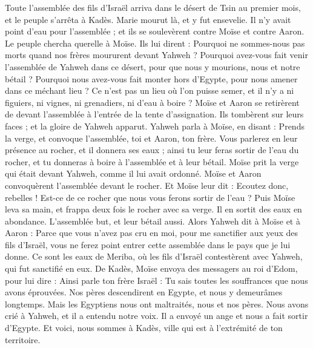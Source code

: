 \begin{multicols}{2}
\VerseOne{}Toute l’assemblée des fils d'Israël arriva dans le désert de Tsin au premier mois, et le peuple s’arrêta à Kadès. Marie mourut là, et y fut ensevelie.
Il n’y avait point d'eau pour l'assemblée ; et ils se soulevèrent contre Moïse et contre Aaron.
Le peuple chercha querelle à Moïse. Ils lui dirent : Pourquoi ne sommes-nous pas morts quand nos frères moururent devant Yahweh ?
Pourquoi avez-vous fait venir l'assemblée de Yahweh dans ce désert, pour que nous y mourions, nous et notre bétail ?
Pourquoi nous avez-vous fait monter hors d'Egypte, pour nous amener dans ce méchant lieu ? Ce n’est pas un lieu où l’on puisse semer, et il n’y a ni figuiers, ni vignes, ni grenadiers, ni d'eau à boire ?
Moïse et Aaron se retirèrent de devant l'assemblée à l'entrée de la tente d'assignation. Ils tombèrent sur leurs faces ; et la gloire de Yahweh apparut.
Yahweh parla à Moïse, en disant :
Prends la verge, et convoque l'assemblée, toi et Aaron, ton frère. Vous parlerez en leur présence au rocher, et il donnera ses eaux ; ainsi tu leur feras sortir de l'eau du rocher, et tu donneras à boire à l'assemblée et à leur bétail.
Moïse prit la verge qui était devant Yahweh, comme il lui avait ordonné.
Moïse et Aaron convoquèrent l'assemblée devant le rocher. Et Moïse leur dit : Ecoutez donc, rebelles ! Est-ce de ce rocher que nous vous ferons sortir de l'eau ?
Puis Moïse leva sa main, et frappa deux fois le rocher avec sa verge. Il en sortit des eaux en abondance. L'assemblée but, et leur bétail aussi.
Alors Yahweh dit à Moïse et à Aaron : Parce que vous n'avez pas cru en moi, pour me sanctifier aux yeux des fils d'Israël, vous ne ferez point entrer cette assemblée dans le pays que je lui donne.
Ce sont les eaux de Meriba, où les fils d'Israël contestèrent avec Yahweh, qui fut sanctifié en eux.
De Kadès, Moïse envoya des messagers au roi d'Edom, pour lui dire : Ainsi parle ton frère Israël : Tu sais toutes les souffrances que nous avons éprouvées.
Nos pères descendirent en Egypte, et nous y demeurâmes longtemps. Mais les Egyptiens nous ont maltraités, nous et nos pères.
Nous avons crié à Yahweh, et il a entendu notre voix. Il a envoyé un ange et nous a fait sortir d'Egypte. Et voici, nous sommes à Kadès, ville qui est à l’extrémité de ton territoire.

\end{multicols}
